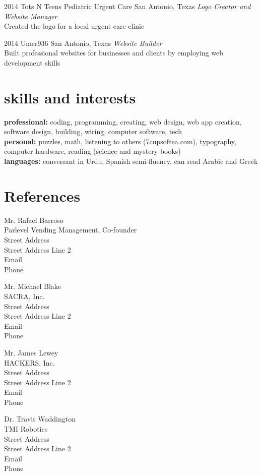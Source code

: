\documentclass[]{friggeri-cv} %
\begin{document}
\begin{entrylist}

	\entry
	{2014}
	{Tots N Teens Pediatric Urgent Care}
	{San Antonio, Texas}
	{\emph{Logo Creator and Website Manager} \\
	Created the logo for a local urgent care clinic}


	\entry
	{2014}
	{Umer936}
	{San Antonio, Texas}
	{\emph{Website Builder} \\
	Built professional websites for businesses and clients by employing web development skills}

\end{entrylist}


\section{skills and interests}

\textbf{professional:} coding, programming, creating, web design, web app creation, software design, building, wiring, computer software, tech
\\
\textbf{personal:} puzzles, math, listening to others (7cupsoftea.com), typography, computer hardware, reading (science and mystery books)   \\
\textbf{languages:} conversant in Urdu, Spanish semi-fluency, can read Arabic and Greek

\pagebreak

\section{References}

Mr. Rafael Barroso \\
Parlevel Vending Management, Co-founder \\
Street Address \\
Street Address Line 2 \\
Email \\
Phone

\vspace{40pt}
Mr. Michael Blake \\
SACRA, Inc. \\
Street Address \\
Street Address Line 2 \\
Email \\
Phone

\vspace{40pt}
Mr. James Lewey \\
HACKERS, Inc. \\
Street Address \\
Street Address Line 2 \\
Email \\
Phone

\vspace{40pt}
Dr. Travis Waddington \\
TMI Robotics \\
Street Address \\
Street Address Line 2 \\
Email \\
Phone
\end{document}
